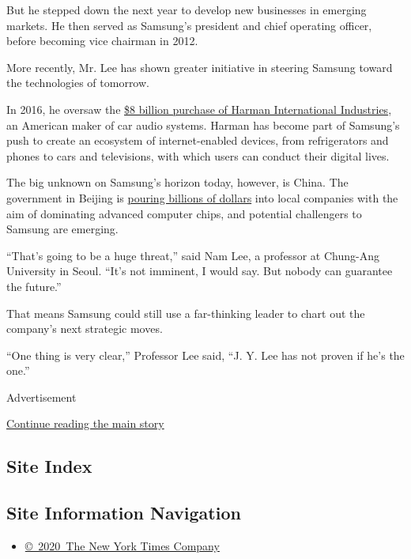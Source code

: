 But he stepped down the next year to develop new businesses in emerging
markets. He then served as Samsung's president and chief operating
officer, before becoming vice chairman in 2012.

More recently, Mr. Lee has shown greater initiative in steering Samsung
toward the technologies of tomorrow.

In 2016, he oversaw the
\href{https://www.nytimes.com/2016/11/15/business/samsung-auto-industry-harman-automotive.html}{\$8
billion purchase of Harman International Industries}, an American maker
of car audio systems. Harman has become part of Samsung's push to create
an ecosystem of internet-enabled devices, from refrigerators and phones
to cars and televisions, with which users can conduct their digital
lives.

The big unknown on Samsung's horizon today, however, is China. The
government in Beijing is
\href{https://www.nytimes.com/2017/11/07/business/made-in-china-technology-trade.html}{pouring
billions of dollars} into local companies with the aim of dominating
advanced computer chips, and potential challengers to Samsung are
emerging.

``That's going to be a huge threat,'' said Nam Lee, a professor at
Chung-Ang University in Seoul. ``It's not imminent, I would say. But
nobody can guarantee the future.''

That means Samsung could still use a far-thinking leader to chart out
the company's next strategic moves.

``One thing is very clear,'' Professor Lee said, ``J. Y. Lee has not
proven if he's the one.''

Advertisement

\protect\hyperlink{after-bottom}{Continue reading the main story}

\hypertarget{site-index}{%
\subsection{Site Index}\label{site-index}}

\hypertarget{site-information-navigation}{%
\subsection{Site Information
Navigation}\label{site-information-navigation}}

\begin{itemize}
\tightlist
\item
  \href{https://help.nytimes.com/hc/en-us/articles/115014792127-Copyright-notice}{©~2020~The
  New York Times Company}
\end{itemize}

